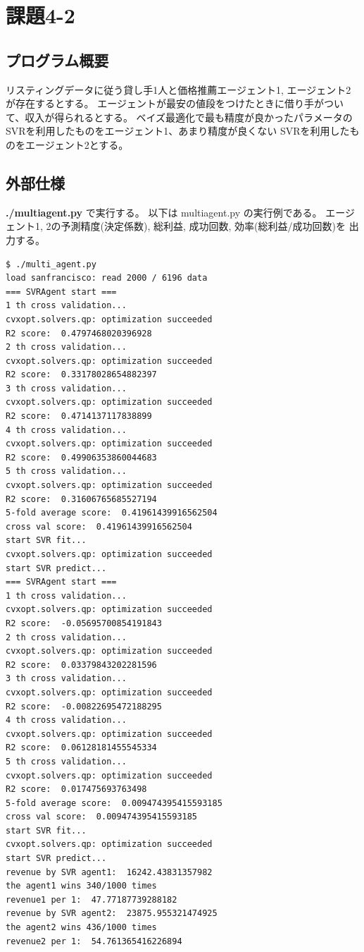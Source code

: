 \documentclass{jsarticle}
\begin{document}
\section{課題4-2}
\subsection{プログラム概要}
リスティングデータに従う貸し手1人と価格推薦エージェント1, エージェント2が存在するとする。
エージェントが最安の値段をつけたときに借り手がついて、収入が得られるとする。
ベイズ最適化で最も精度が良かったパラメータのSVRを利用したものをエージェント1、あまり精度が良くない
SVRを利用したものをエージェント2とする。

\subsection{外部仕様}
{\bf ./multiagent.py} で実行する。
以下は multiagent.py の実行例である。
エージェント1, 2の予測精度(決定係数), 総利益, 成功回数, 効率(総利益/成功回数)を
出力する。
\begin{lstlisting}
$ ./multi_agent.py 
load sanfrancisco: read 2000 / 6196 data
=== SVRAgent start ===
1 th cross validation...
cvxopt.solvers.qp: optimization succeeded
R2 score:  0.4797468020396928
2 th cross validation...
cvxopt.solvers.qp: optimization succeeded
R2 score:  0.33178028654882397
3 th cross validation...
cvxopt.solvers.qp: optimization succeeded
R2 score:  0.4714137117838899
4 th cross validation...
cvxopt.solvers.qp: optimization succeeded
R2 score:  0.49906353860044683
5 th cross validation...
cvxopt.solvers.qp: optimization succeeded
R2 score:  0.31606765685527194
5-fold average score:  0.41961439916562504
cross val score:  0.41961439916562504
start SVR fit...
cvxopt.solvers.qp: optimization succeeded
start SVR predict...
=== SVRAgent start ===
1 th cross validation...
cvxopt.solvers.qp: optimization succeeded
R2 score:  -0.05695700854191843
2 th cross validation...
cvxopt.solvers.qp: optimization succeeded
R2 score:  0.03379843202281596
3 th cross validation...
cvxopt.solvers.qp: optimization succeeded
R2 score:  -0.00822695472188295
4 th cross validation...
cvxopt.solvers.qp: optimization succeeded
R2 score:  0.06128181455545334
5 th cross validation...
cvxopt.solvers.qp: optimization succeeded
R2 score:  0.017475693763498
5-fold average score:  0.009474395415593185
cross val score:  0.009474395415593185
start SVR fit...
cvxopt.solvers.qp: optimization succeeded
start SVR predict...
revenue by SVR agent1:  16242.43831357982
the agent1 wins 340/1000 times
revenue1 per 1:  47.77187739288182
revenue by SVR agent2:  23875.955321474925
the agent2 wins 436/1000 times
revenue2 per 1:  54.761365416226894
\end{lstlisting}
\end{document}

